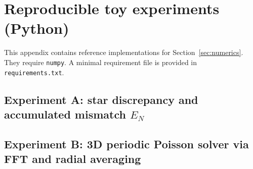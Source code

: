\section{Reproducible toy experiments (Python)}
\label{app:repro_code}

This appendix contains reference implementations for Section~\ref{sec:numerics}.
They require \texttt{numpy}. A minimal requirement file is provided in \texttt{requirements.txt}.

\subsection{Experiment A: star discrepancy and accumulated mismatch \texorpdfstring{$E_N$}{E\_N}}


\subsection{Experiment B: 3D periodic Poisson solver via FFT and radial averaging}



